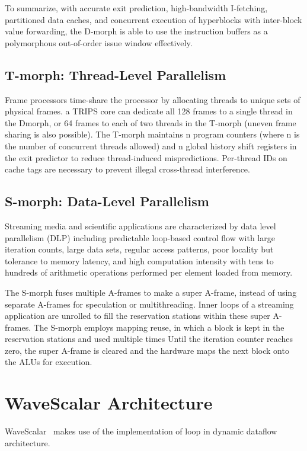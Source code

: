 \documentclass[UTF8,12pt,a4paper]{article}
\begin{document}
To summarize, with accurate exit prediction, high-bandwidth I-fetching,
partitioned data caches, and concurrent execution of hyperblocks with inter-block value forwarding,
the D-morph is able to use the instruction buffers as a polymorphous out-of-order issue window effectively.

\subsection{T-morph: Thread-Level Parallelism}
Frame processors time-share the processor by allocating threads to unique sets of physical frames.
a TRIPS core can dedicate all 128 frames to a single thread in the Dmorph,
or 64 frames to each of two threads in the T-morph (uneven frame sharing is also possible).
The T-morph maintains n program counters (where n is the number of concurrent threads allowed)
and n global history shift registers in the exit predictor to reduce thread-induced mispredictions.
Per-thread IDs on cache tags are necessary to prevent illegal cross-thread interference.

\subsection{S-morph: Data-Level Parallelism}
Streaming media and scientific applications are characterized by data level parallelism (DLP)
including predictable loop-based control flow with large iteration counts,
large data sets, regular access patterns, poor locality but tolerance to memory latency,
and high computation intensity with tens to hundreds of arithmetic operations performed per element loaded from memory.

The S-morph fuses multiple A-frames to make a super A-frame,
instead of using separate A-frames for speculation or multithreading.
Inner loops of a streaming application are unrolled
to fill the reservation stations within these super A-frames.
The S-morph employs mapping reuse, in which a block is kept in the reservation stations and used multiple times
Until the iteration counter reaches zero, the super A-frame is cleared
and the hardware maps the next block onto the ALUs for execution.

\clearpage

\section{WaveScalar Architecture}

WaveScalar~\cite{DBLP:conf/micro/SwansonMSO03}\cite{DBLP:journals/tocs/SwansonSMPPMOE07}
makes use of the implementation of loop in dynamic dataflow architecture.
\end{document}
